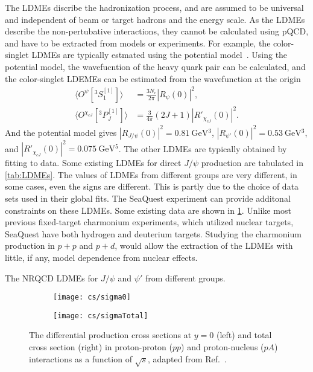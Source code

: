 \documentclass[../main.tex]{subfiles}
\begin{document}
The LDMEs discribe the hadronization process,
and are assumed to be universal and independent of beam or target hadrons and the energy scale.
As the LDMEs describe the non-pertubative interactions,
they cannot be calculated using pQCD, and have to be extracted from models or experiments.
For example, the color-singlet LDMEs are typically estmated using the potential model~\cite{eichten1995}.
Using the potential model, the wavefucntion of the heavy quark pair can be calculated, 
and the color-singlet LDEMEs can be estimated from the wavefunction at the origin
\begin{equation}
	\begin{split}
		\langle O^{\psi}[^3S_1^{\left[1\right]}]\rangle &= \frac{3N_c}{2\pi} \left| R_{\psi}\left(0\right)\right|^2,\\
		\langle O^{\chi_{cJ}}[^3P_J^{\left[1\right]}]\rangle &= \frac{3}{4\pi}\left(2J+1\right) \left| R'_{\chi_{cJ}}\left(0\right)\right|^2.
	\end{split}
\end{equation}
And the potential model gives $\left|R_{J/\psi}\left(0\right)\right|^2=\SI{0.81}{\GeV^3}$,
$\left|R_{\psi'}\left(0\right)\right|^2=\SI{0.53}{\GeV^3}$, and $\left|R'_{\chi_{cJ}}\left(0\right)\right|^2=\SI{0.075}{\GeV^5}$.
The other LDMEs are typically obtained by fitting to data.
Some existing LDMEs for direct $J/\psi$ production are tabulated in \cref{tab:LDMEs}.
The values of LDMEs from different groups are very different, in some cases, even the signs are different.
This is partly due to the choice of data sets used in their global fits. The
SeaQuest experiment can provide additonal constraints on these LDMEs. Some
existing data are shown in \cref{fig:charm_cs}.
Unlike most previous fixed-target charmonium experiments, which utilized nuclear
targets, SeaQuest have both hydrogen and deuterium targets.
Studying the charmonium production in $p+p$ and $p+d$, would allow the extraction
of the LDMEs with little, if any, model dependence from nuclear effects.

\begin{table}[ht!]
	\centering
	\caption{The NRQCD LDMEs for $J/\psi$ and $\psi'$ from different groups.}
	\label{tab:LDMEs}
	\scalebox{0.81}{
		
	}
\end{table}

\begin{figure}[ht!]
	\centering
	\begin{subfigure}{0.45\linewidth}
		\texttt{[image: cs/sigma0]}
	\end{subfigure}
	\begin{subfigure}{0.45\linewidth}
		\texttt{[image: cs/sigmaTotal]}
	\end{subfigure}
	\caption{The differential production cross sections at $y=0$ (left) and total
		cross section (right) in proton-proton ($pp$) and proton-nucleus ($pA$) interactions
		as a function of $\sqrt{s}$, adapted from Ref.~\cite{maltoni2006}.}
	\label{fig:charm_cs}
\end{figure}
\end{document}
